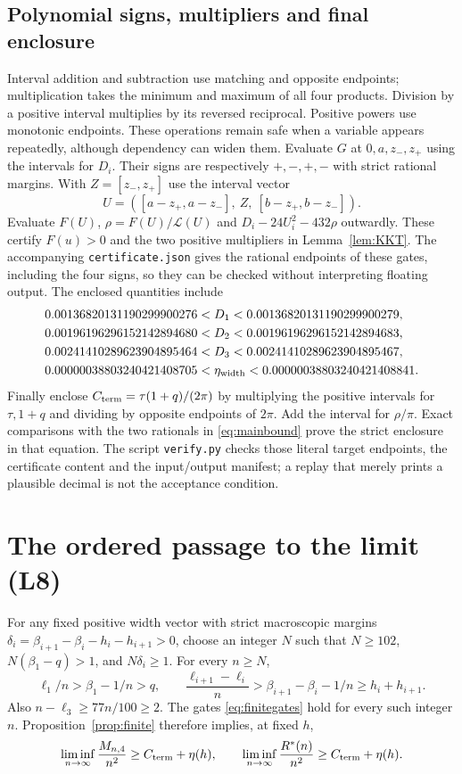 \documentclass[11pt,a4paper]{article}
\theoremstyle{remark}\newtheorem{remark}[theorem]{Remark}
\newcommand{\Rstar}{R^*}
\newcommand{\Cterm}{C_{\rm term}}
\newcommand{\etaw}{\eta_{\rm width}}
\begin{document}
\subsection{Polynomial signs, multipliers and final enclosure}
Interval addition and subtraction use matching and opposite endpoints;
multiplication takes the minimum and maximum of all four products.
Division by a positive interval multiplies by its reversed reciprocal.
Positive powers use monotonic endpoints. These operations remain safe
when a variable appears repeatedly, although dependency can widen them.
Evaluate $G$ at $0,a,z_-,z_+$ using the intervals for $D_i$.
Their signs are respectively $+,-,+,-$ with strict rational margins.
With $Z=[z_-,z_+]$ use the interval vector
\[
U=([a-z_+,a-z_-],\ Z,\ [b-z_+,b-z_-]).
\]
Evaluate $F(U)$, $\rho=F(U)/\mathcal L(U)$ and
$D_i-24U_i^2-432\rho$ outwardly. These certify $F(u)>0$ and the
two positive multipliers in Lemma~\ref{lem:KKT}. The accompanying
\texttt{certificate.json} gives the rational endpoints of these gates,
including the four signs, so they can be checked without interpreting
floating output. The enclosed quantities include
\begin{align*}
0.00136820131190299900276&<D_1<0.00136820131190299900279,\\
0.00196196296152142894680&<D_2<0.00196196296152142894683,\\
0.00241410289623904895464&<D_3<0.00241410289623904895467,\\
0.00000038803240421408705&<\etaw<0.00000038803240421408841.
\end{align*}
Finally enclose $\Cterm=\tau(1+q)/(2\pi)$ by multiplying the positive
intervals for $\tau,1+q$ and dividing by opposite endpoints of $2\pi$.
Add the interval for $\rho/\pi$. Exact comparisons with the two rationals
in \eqref{eq:mainbound} prove the strict enclosure in that equation.
The script \texttt{verify.py} checks those literal target endpoints, the
certificate content and the input/output manifest; a replay that merely
prints a plausible decimal is not the acceptance condition.

\section{The ordered passage to the limit (L8)}\label{sec:limit}
For any fixed positive width vector with strict macroscopic margins
$\delta_i=\beta_{i+1}-\beta_i-h_i-h_{i+1}>0$, choose an integer $N$
such that $N\ge102$, $N(\beta_1-q)>1$, and $N\delta_i\ge1$.
For every $n\ge N$,
\[
\ell_1/n>\beta_1-1/n>q,\qquad
\frac{\ell_{i+1}-\ell_i}{n}>
\beta_{i+1}-\beta_i-1/n\ge h_i+h_{i+1}.
\]
Also $n-\ell_3\ge77n/100\ge2$. The gates \eqref{eq:finitegates}
hold for every such integer $n$. Proposition~\ref{prop:finite} therefore
implies, at fixed $h$,
\begin{equation}\label{eq:fixedlimit}
\liminf_{n\to\infty}\frac{M_{n,4}}{n^2}\ge\Cterm+\eta(h),\qquad
\liminf_{n\to\infty}\frac{\Rstar(n)}{n^2}\ge\Cterm+\eta(h).
\end{equation}
\end{document}
